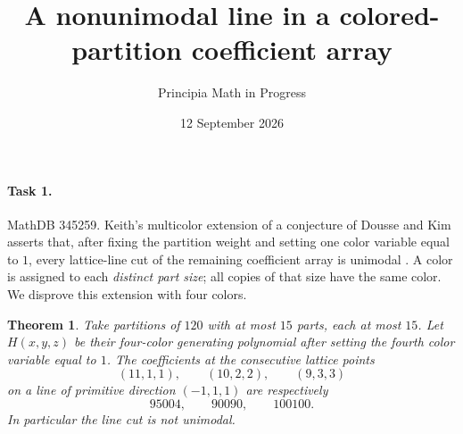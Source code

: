 \documentclass[10pt]{article}
\title{A nonunimodal line in a colored-partition coefficient array}
\author{Principia Math in Progress}
\date{12 September 2026}
\newtheorem{theorem}{Theorem}
\begin{document}
\maketitle

\paragraph{Task 1.}
MathDB 345259.
Keith's multicolor extension of a conjecture of Dousse and Kim asserts
that, after fixing the partition weight and setting one color variable
equal to \(1\), every lattice-line cut of the remaining coefficient array
is unimodal \cite[Conjecture 1]{Keith}. A color is assigned to each
\emph{distinct part size}; all copies of that size have the same color.
We disprove this extension with four colors.

\begin{theorem}
Take partitions of \(120\) with at most \(15\) parts, each at most \(15\).
Let \(H(x,y,z)\) be their four-color generating polynomial after setting
the fourth color variable equal to \(1\).
The coefficients at the consecutive lattice points
\[
 (11,1,1),\qquad(10,2,2),\qquad(9,3,3)
\]
on a line of primitive direction \((-1,1,1)\) are respectively
\[
 \boxed{95004,\qquad 90090,\qquad 100100.}
\]
In particular the line cut is not unimodal.
\end{theorem}
\end{document}
